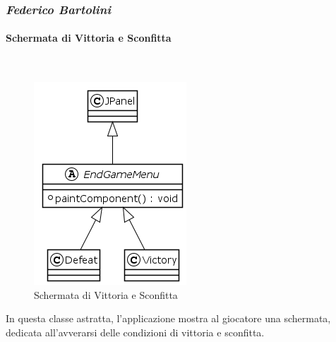 \documentclass[a4paper,titlepage,12pt]{article}
\begin{document}
\subsubsection*{\large \slshape Federico Bartolini}
\paragraph{Schermata di Vittoria e Sconfitta}
\par \noindent \\
\begin{figure}[H]
    \centering
    \includegraphics[scale=0.8]{img/uml/EndGameMenu.png}
    \caption{Schermata di Vittoria e Sconfitta}
    \label{fig: Schermata di Vittoria e Sconfitta}
\end{figure}
\par \noindent In questa classe astratta, l’applicazione mostra al giocatore una schermata, dedicata all’avverarsi delle condizioni di vittoria e sconfitta.
\end{document}
